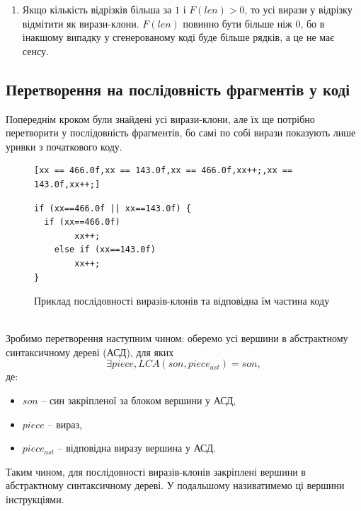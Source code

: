 \documentclass[a4paper, 14pt]{article}
\begin{document}
\begin{itemize}
{\begin{enumerate}
{де:
\begin{itemize}
\item $len*goodGraphs$ -- приблизна початкова кількість рядків коду;
\item $goodGraphs$ -- кількість потрібних викликів нової функції, кожен виклик зазвичай займає 1 рядок;
\item $2*T*goodGraphs$ -- приблизна кількість рядків коду, потрібного для врахування усіх відмінностей між послідовностями виразів;
\item $len$ -- приблизна кількість рядків коду, що є повністю ідентичним між усіма послідовностями;
\item $2$ -- кількість рядків, необхідна щоб записати функцію у коді.
\end{itemize}
$$F(len) = len*goodGraphs-goodGraphs-2*T*goodGraphs-len-2$$
$$F(len) = (len-1)*goodGraphs-2*T*goodGraphs-len-2$$
$$F(len) = (len-2*T-1)*goodGraphs-len-2$$
}
\item Якщо кількість відрізків більша за $1$ і $F(len)>0$, то усі вирази у відрізку відмітити як вирази-клони.
$F(len)$ повинно бути більше ніж 0, бо в інакшому випадку у сгенерованому коді буде більше рядків, а це не має сенсу.
\end{enumerate}
}
\end{itemize}
\subsection{Перетворення на послідовність фрагментів у коді}
Попереднім кроком були знайдені усі вирази-клони, але їх ще потрібно перетворити у послідовність фрагментів, бо самі по собі вирази показують лише уривки з початкового коду.   
\begin{figure}[h!]
\centering
\begin{minipage}{.5\textwidth}
\begin{lstlisting}[frame=none]
[xx == 466.0f,xx == 143.0f,xx == 466.0f,xx++;,xx == 143.0f,xx++;]
\end{lstlisting}
\end{minipage}
\begin{minipage}{.4\textwidth}
\begin{lstlisting}[frame=none]
if (xx==466.0f || xx==143.0f) {
  if (xx==466.0f)
		xx++;
	else if (xx==143.0f)
		xx++;
}	
\end{lstlisting}
\end{minipage}
\caption{Приклад послідовності виразів-клонів та відповідна їм частина коду}
\end{figure} \\
Зробимо перетворення наступним чином: оберемо усі вершини в абстрактному синтаксичному дереві (АСД), для яких
$$\exists piece, LCA(son, piece_{ast}) = son,$$
де:
\begin{itemize}
\item $son$ -- син закріпленої за блоком вершини у АСД, 
\item $piece$ -- вираз, 
\item $piece_{ast}$ -- відповідна виразу вершина у АСД.
\end{itemize}
Таким чином, для послідовності виразів-клонів закріплені вершини в абстрактному синтаксичному дереві.
У подальшому називатимемо ці вершини інструкціями.
\end{document}

